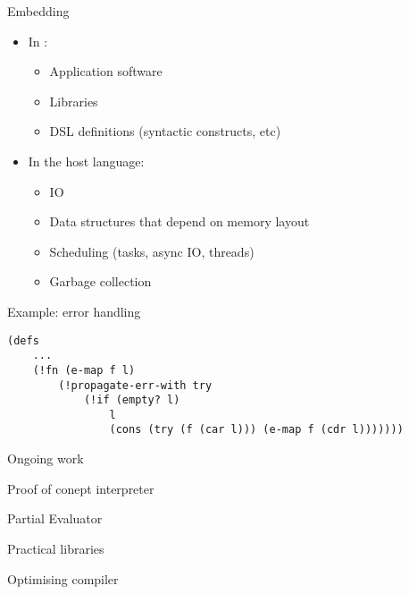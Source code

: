 \begin{frame}[fragile]{Embedding}
\begin{itemize}
    \item In \lang:
        \begin{itemize}
            \item Application software
            \item Libraries
            \item DSL definitions (syntactic constructs, etc)
        \end{itemize}
    \item In the host language:
        \begin{itemize}
            \item IO
            \item Data structures that depend on memory layout
            \item Scheduling (tasks, async IO, threads)
            \item Garbage collection
        \end{itemize}
\end{itemize}
\end{frame}

\begin{frame}[fragile]{Example: error handling}

\begin{verbatim}
(defs
    ...
    (!fn (e-map f l)
        (!propagate-err-with try
            (!if (empty? l)
                l
                (cons (try (f (car l))) (e-map f (cdr l)))))))
\end{verbatim}

\end{frame}

\begin{frame}[fragile]{Ongoing work}
\begin{todolist}
  \item[\done] Proof of conept interpreter
  \item Partial Evaluator
  \item Practical libraries
  \item Optimising compiler
\end{todolist}
\end{frame}


